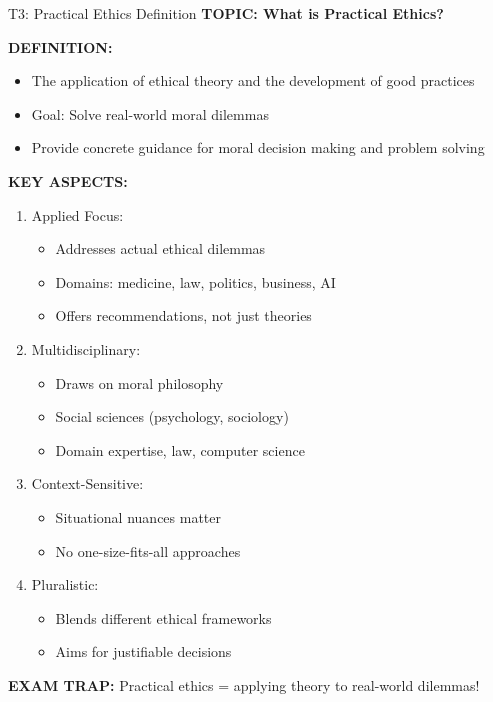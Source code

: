 \documentclass[8pt]{beamer}
\begin{document}
	\begin{frame}{T3: Practical Ethics Definition}
		\fontsize{6.5}{7.5}\selectfont
		\textbf{TOPIC: What is Practical Ethics?}
		
		\vspace{0.1cm}
		\textbf{DEFINITION:}
		\begin{itemize}
			\item The application of ethical theory and the development of good practices
			\item Goal: Solve real-world moral dilemmas
			\item Provide concrete guidance for moral decision making and problem solving
		\end{itemize}
		
		\vspace{0.1cm}
		\textbf{KEY ASPECTS:}
		\begin{enumerate}
			\item \textcolor{myblue}{Applied Focus:}
			\begin{itemize}
				\item Addresses actual ethical dilemmas
				\item Domains: medicine, law, politics, business, AI
				\item Offers recommendations, not just theories
			\end{itemize}
			\item \textcolor{myblue}{Multidisciplinary:}
			\begin{itemize}
				\item Draws on moral philosophy
				\item Social sciences (psychology, sociology)
				\item Domain expertise, law, computer science
			\end{itemize}
			\item \textcolor{myblue}{Context-Sensitive:}
			\begin{itemize}
				\item Situational nuances matter
				\item No one-size-fits-all approaches
			\end{itemize}
			\item \textcolor{myblue}{Pluralistic:}
			\begin{itemize}
				\item Blends different ethical frameworks
				\item Aims for justifiable decisions
			\end{itemize}
		\end{enumerate}
		
		\textcolor{myred}{\textbf{EXAM TRAP:}} Practical ethics = \textcolor{myblue}{applying theory to real-world dilemmas}!
	\end{frame}
	
\end{document}
